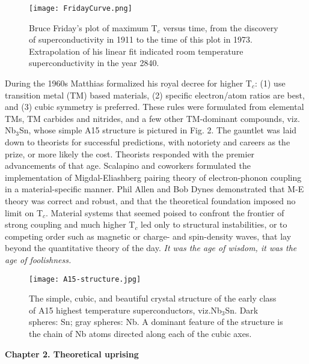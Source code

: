 \documentclass[aps,prb,twocolumn,groupedaddress]{revtex4}
\begin{document}
\begin{figure}[!ht]
\texttt{[image: FridayCurve.png]}
\caption{
Bruce Friday's plot of maximum T$_c$ versus time, from the discovery of
superconductivity in 1911 to the time of this plot in 1973.
Extrapolation of his linear fit indicated room temperature superconductivity
in the year 2840.
}
\label{Tc-vs-time}
\end{figure}

During the 1960s Matthias formalized\cite{Matthias} his 
royal decree for higher T$_c$: (1) use transition metal (TM) based materials, 
(2) specific electron/atom ratios are best, and (3) cubic symmetry is preferred. 
These rules were formulated from elemental TMs, TM carbides and nitrides, and a 
few other TM-dominant compounds, viz. Nb$_3$Sn, whose simple A15 structure is pictured
in Fig. 2. The gauntlet was 
laid down to theorists for successful predictions, with notoriety and careers
as the prize, or more likely the cost.  Theorists responded with the 
premier advancements of that
age. Scalapino and coworkers formulated\cite{Scalapino} 
the implementation of Migdal-Eliashberg
pairing theory of electron-phonon coupling in a material-specific manner.  
Phil Allen and Bob Dynes 
demonstrated that M-E theory was correct and robust,\cite{Allen} 
and that the theoretical foundation
imposed no limit on T$_c$. Material systems that seemed poised to confront the 
frontier of strong coupling and much higher T$_c$
led only to structural instabilities, or to competing order such as magnetic
or charge- and spin-density waves, that lay beyond the quantitative theory of the day.
{\it It was the age of wisdom, it was the age of foolishness.}

\begin{figure}[!ht]
\texttt{[image: A15-structure.jpg]}
\caption{
The simple, cubic, and beautiful crystal structure of the
early class of A15
highest temperature superconductors, viz.Nb$_3$Sn. Dark spheres: Sn;
gray spheres: Nb. A dominant feature of the  structure is the chain
of Nb atoms directed along each of the cubic axes.
}
\label{A15-structure}
\end{figure}


\begin{center}{\bf Chapter 2. Theoretical uprising} \end{center}
\end{document}
